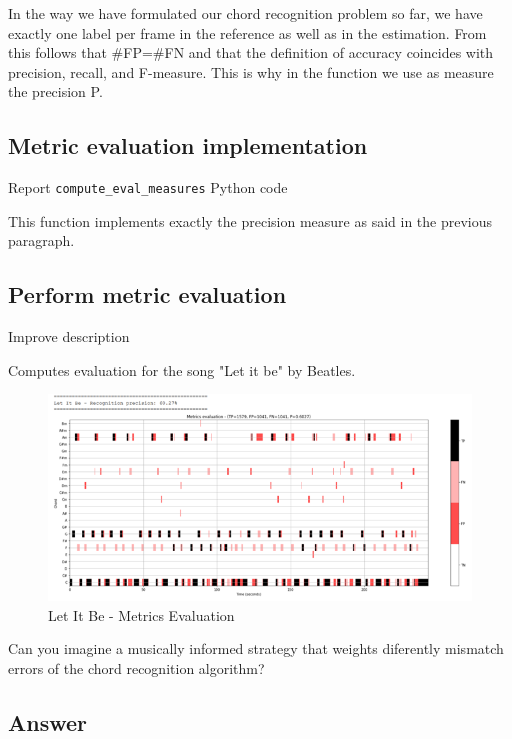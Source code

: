\documentclass[
	12pt, %
]{fphw}
\begin{document}
In the way we have formulated our chord recognition problem so far, we have exactly one label per frame in the reference as well as in the estimation. From this follows that \#FP=\#FN and that the definition of accuracy coincides with precision, recall, and F-measure. This is why in the function we use as measure the precision P.

\subsection*{Metric evaluation implementation}

\color{red}Report \verb|compute_eval_measures| Python code\color{black}

This function implements exactly the precision measure as said in the previous paragraph.

\subsection*{Perform metric evaluation}

\color{red}Improve description\color{black}

Computes evaluation for the song "Let it be" by Beatles.

\begin{figure}[H]
 \centering
 \includegraphics[scale=1]{./images/3_let_it_be_metrics.png}
 \caption{Let It Be - Metrics Evaluation}
\end{figure}

\begin{problem}
	Can you imagine a musically informed strategy that weights diferently mismatch errors of
the chord recognition algorithm?
\end{problem}

\subsection*{\color{blue}Answer}
\end{document}
